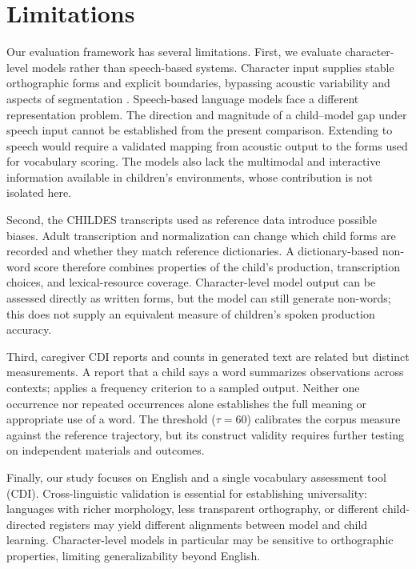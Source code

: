 


 
\section{Limitations}

Our evaluation framework has several limitations. First, we evaluate character-level models rather than speech-based systems. Character input supplies stable orthographic forms and explicit boundaries, bypassing acoustic variability and aspects of segmentation \citep{dupoux2018cognitive}. Speech-based language models \citep{lakhotia2021generative,nguyen2024spirit} face a different representation problem. The direction and magnitude of a child--model gap under speech input cannot be established from the present comparison. Extending \meCDI{} to speech would require a validated mapping from acoustic output to the forms used for vocabulary scoring. The models also lack the multimodal and interactive information available in children's environments, whose contribution is not isolated here.

Second, the CHILDES transcripts used as reference data introduce possible biases. Adult transcription and normalization can change which child forms are recorded and whether they match reference dictionaries. A dictionary-based non-word score therefore combines properties of the child's production, transcription choices, and lexical-resource coverage. Character-level model output can be assessed directly as written forms, but the model can still generate non-words; this does not supply an equivalent measure of children's spoken production accuracy.


Third, caregiver CDI reports and counts in generated text are related but distinct measurements. A report that a child says a word summarizes observations across contexts; \meCDI{} applies a frequency criterion to a sampled output. Neither one occurrence nor repeated occurrences alone establishes the full meaning or appropriate use of a word. The threshold ($\tau = 60$) calibrates the corpus measure against the reference trajectory, but its construct validity requires further testing on independent materials and outcomes.


Finally, our study focuses on English and a single vocabulary assessment tool (CDI). Cross-linguistic validation is essential for establishing universality: languages with richer morphology, less transparent orthography, or different child-directed registers may yield different alignments between model and child learning. Character-level models in particular may be sensitive to orthographic properties, limiting generalizability beyond English.


